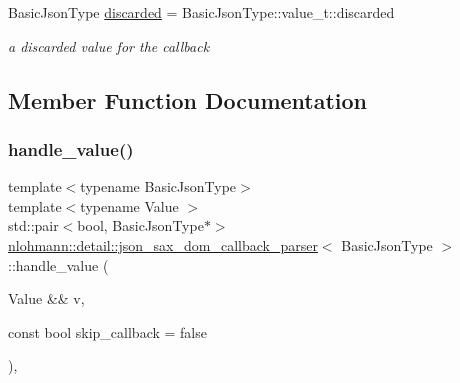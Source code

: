 \begin{DoxyCompactItemize}
\mbox{\label{classnlohmann_1_1detail_1_1json__sax__dom__callback__parser_a8997ee6dc3bd39116b951465b946445e}} 
Basic\+Json\+Type \mbox{\hyperlink{classnlohmann_1_1detail_1_1json__sax__dom__callback__parser_a8997ee6dc3bd39116b951465b946445e}{discarded}} = Basic\+Json\+Type\+::value\+\_\+t\+::discarded
\begin{DoxyCompactList}\small\item\em a discarded value for the callback \end{DoxyCompactList}\end{DoxyCompactItemize}


\subsection{Member Function Documentation}
\mbox{\label{classnlohmann_1_1detail_1_1json__sax__dom__callback__parser_a875e678e20e75b37b93b80be78fe60e6}} 
\subsubsection{\texorpdfstring{handle\+\_\+value()}{handle\_value()}}
{\footnotesize\ttfamily template$<$typename Basic\+Json\+Type$>$ \\
template$<$typename Value $>$ \\
std\+::pair$<$bool, Basic\+Json\+Type$\ast$$>$ \mbox{\hyperlink{classnlohmann_1_1detail_1_1json__sax__dom__callback__parser}{nlohmann\+::detail\+::json\+\_\+sax\+\_\+dom\+\_\+callback\+\_\+parser}}$<$ Basic\+Json\+Type $>$\+::handle\+\_\+value (\begin{DoxyParamCaption}\item[{Value \&\&}]{v,  }\item[{const bool}]{skip\+\_\+callback = {\ttfamily false} }\end{DoxyParamCaption})\hspace{0.3cm}{\ttfamily [inline]}, {\ttfamily [private]}}


